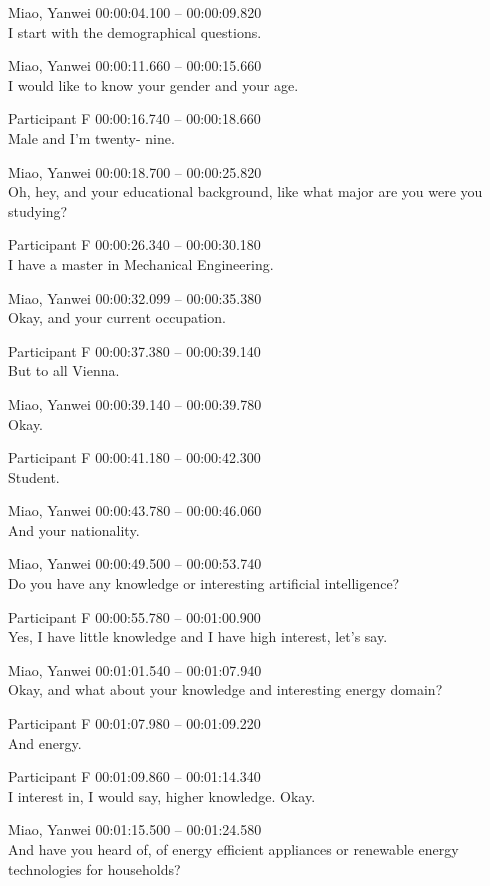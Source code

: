 {\parindent0pt
\tiny
\singlespacing
Miao, Yanwei 00:00:04.100 -- 00:00:09.820 \\
I start with the demographical questions.

Miao, Yanwei 00:00:11.660 -- 00:00:15.660 \\
I would like to know your gender and your age.

Participant F 00:00:16.740 -- 00:00:18.660 \\
Male and I'm twenty- nine.

Miao, Yanwei 00:00:18.700 -- 00:00:25.820 \\
Oh, hey, and your educational background, like what major are you were you studying?

Participant F 00:00:26.340 -- 00:00:30.180 \\
I have a master in Mechanical Engineering.

Miao, Yanwei 00:00:32.099 -- 00:00:35.380 \\
Okay, and your current occupation.

Participant F 00:00:37.380 -- 00:00:39.140 \\
But to all Vienna.

Miao, Yanwei 00:00:39.140 -- 00:00:39.780 \\
Okay.

Participant F 00:00:41.180 -- 00:00:42.300 \\
Student.

Miao, Yanwei 00:00:43.780 -- 00:00:46.060 \\
And your nationality.

Miao, Yanwei 00:00:49.500 -- 00:00:53.740 \\
Do you have any knowledge or interesting artificial intelligence?

Participant F 00:00:55.780 -- 00:01:00.900 \\
Yes, I have little knowledge and I have high interest, let's say.

Miao, Yanwei 00:01:01.540 -- 00:01:07.940 \\
Okay, and what about your knowledge and interesting energy domain?

Participant F 00:01:07.980 -- 00:01:09.220 \\
And energy.

Participant F 00:01:09.860 -- 00:01:14.340 \\
I interest in, I would say, higher knowledge. Okay.

Miao, Yanwei 00:01:15.500 -- 00:01:24.580 \\
And have you heard of, of energy efficient appliances or renewable energy technologies for households?

}
